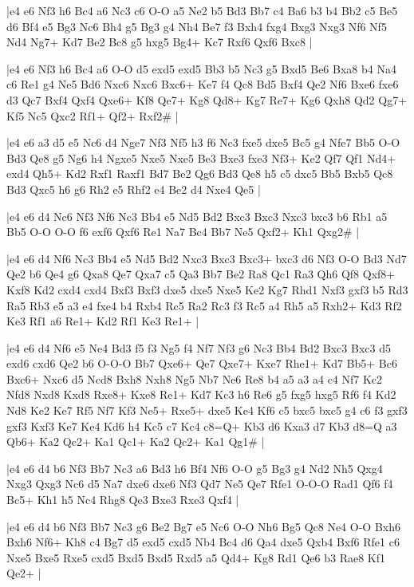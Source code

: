 \whitename{}
\blackname{}
\makegametitle
|e4 e6 Nf3 h6 Bc4 a6 Nc3 c6 O-O a5 Ne2 b5 Bd3 Bb7 c4 Ba6 b3 b4 Bb2 c5 Be5 d6 Bf4 e5 Bg3 Nc6 Bh4 g5 Bg3 g4 Nh4 Be7 f3 Bxh4 fxg4 Bxg3 Nxg3 Nf6 Nf5 Nd4 Ng7+ Kd7 Be2 Bc8 g5 hxg5 Bg4+ Kc7 Rxf6 Qxf6 Bxc8  |

\whitename{}
\blackname{}
\makegametitle
|e4 e6 Nf3 h6 Bc4 a6 O-O d5 exd5 exd5 Bb3 b5 Nc3 g5 Bxd5 Be6 Bxa8 b4 Na4 c6 Re1 g4 Ne5 Bd6 Nxc6 Nxc6 Bxc6+ Ke7 f4 Qc8 Bd5 Bxf4 Qe2 Nf6 Bxe6 fxe6 d3 Qc7 Bxf4 Qxf4 Qxe6+ Kf8 Qe7+ Kg8 Qd8+ Kg7 Re7+ Kg6 Qxh8 Qd2 Qg7+ Kf5 Nc5 Qxc2 Rf1+ Qf2+ Rxf2\#  |

\whitename{}
\blackname{}
\makegametitle
|e4 e6 a3 d5 e5 Nc6 d4 Nge7 Nf3 Nf5 h3 f6 Nc3 fxe5 dxe5 Bc5 g4 Nfe7 Bb5 O-O Bd3 Qe8 g5 Ng6 h4 Ngxe5 Nxe5 Nxe5 Be3 Bxe3 fxe3 Nf3+ Ke2 Qf7 Qf1 Nd4+ exd4 Qh5+ Kd2 Rxf1 Raxf1 Bd7 Be2 Qg6 Bd3 Qe8 h5 c5 dxc5 Bb5 Bxb5 Qc8 Bd3 Qxc5 h6 g6 Rh2 e5 Rhf2 e4 Be2 d4 Nxe4 Qe5  |

\whitename{}
\blackname{}
\makegametitle
|e4 e6 d4 Nc6 Nf3 Nf6 Nc3 Bb4 e5 Nd5 Bd2 Bxc3 Bxc3 Nxc3 bxc3 b6 Rb1 a5 Bb5 O-O O-O f6 exf6 Qxf6 Re1 Na7 Bc4 Bb7 Ne5 Qxf2+ Kh1 Qxg2\#  |

\whitename{}
\blackname{}
\makegametitle
|e4 e6 d4 Nf6 Nc3 Bb4 e5 Nd5 Bd2 Nxc3 Bxc3 Bxc3+ bxc3 d6 Nf3 O-O Bd3 Nd7 Qe2 b6 Qe4 g6 Qxa8 Qe7 Qxa7 c5 Qa3 Bb7 Be2 Ra8 Qc1 Ra3 Qh6 Qf8 Qxf8+ Kxf8 Kd2 cxd4 cxd4 Bxf3 Bxf3 dxe5 dxe5 Nxe5 Ke2 Kg7 Rhd1 Nxf3 gxf3 b5 Rd3 Ra5 Rb3 e5 a3 e4 fxe4 b4 Rxb4 Rc5 Ra2 Rc3 f3 Rc5 a4 Rh5 a5 Rxh2+ Kd3 Rf2 Ke3 Rf1 a6 Re1+ Kd2 Rf1 Ke3 Re1+  |

\whitename{}
\blackname{}
\makegametitle
|e4 e6 d4 Nf6 e5 Ne4 Bd3 f5 f3 Ng5 f4 Nf7 Nf3 g6 Nc3 Bb4 Bd2 Bxc3 Bxc3 d5 exd6 cxd6 Qe2 b6 O-O-O Bb7 Qxe6+ Qe7 Qxe7+ Kxe7 Rhe1+ Kd7 Bb5+ Bc6 Bxc6+ Nxc6 d5 Ncd8 Bxh8 Nxh8 Ng5 Nb7 Ne6 Re8 b4 a5 a3 a4 c4 Nf7 Kc2 Nfd8 Nxd8 Kxd8 Rxe8+ Kxe8 Re1+ Kd7 Kc3 h6 Re6 g5 fxg5 hxg5 Rf6 f4 Kd2 Nd8 Ke2 Ke7 Rf5 Nf7 Kf3 Ne5+ Rxe5+ dxe5 Ke4 Kf6 c5 bxc5 bxc5 g4 c6 f3 gxf3 gxf3 Kxf3 Ke7 Ke4 Kd6 h4 Kc5 c7 Kc4 c8=Q+ Kb3 d6 Kxa3 d7 Kb3 d8=Q a3 Qb6+ Ka2 Qc2+ Ka1 Qc1+ Ka2 Qc2+ Ka1 Qg1\#  |

\whitename{}
\blackname{}
\makegametitle
|e4 e6 d4 b6 Nf3 Bb7 Nc3 a6 Bd3 h6 Bf4 Nf6 O-O g5 Bg3 g4 Nd2 Nh5 Qxg4 Nxg3 Qxg3 Nc6 d5 Na7 dxe6 dxe6 Nf3 Qd7 Ne5 Qe7 Rfe1 O-O-O Rad1 Qf6 f4 Bc5+ Kh1 h5 Nc4 Rhg8 Qe3 Bxe3 Rxe3 Qxf4  |

\whitename{}
\blackname{}
\makegametitle
|e4 e6 d4 b6 Nf3 Bb7 Nc3 g6 Be2 Bg7 e5 Nc6 O-O Nh6 Bg5 Qc8 Ne4 O-O Bxh6 Bxh6 Nf6+ Kh8 c4 Bg7 d5 exd5 cxd5 Nb4 Bc4 d6 Qa4 dxe5 Qxb4 Bxf6 Rfe1 c6 Nxe5 Bxe5 Rxe5 cxd5 Bxd5 Bxd5 Rxd5 a5 Qd4+ Kg8 Rd1 Qe6 b3 Rae8 Kf1 Qe2+  |

